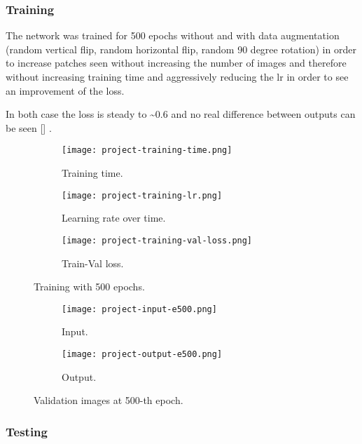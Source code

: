 \subsubsection{Training}

The network was trained for 500 epochs without and with data augmentation (random vertical flip, random horizontal flip, random 90 degree rotation) in order to increase patches seen without increasing the number of images and therefore without increasing training time and  aggressively reducing the lr in order to see an improvement of the loss.

In both case the loss is steady to \textasciitilde 0.6 and no real difference between outputs can be seen [] .

\begin{figure}[H]
    \begin{subfigure}{\textwidth}
        \centering
        \texttt{[image: project-training-time.png]}
        \caption{Training time.}
    \end{subfigure}
    \begin{subfigure}{\textwidth}
        \centering
        \texttt{[image: project-training-lr.png]}
        \caption{Learning rate over time.}
    \end{subfigure}
    \begin{subfigure}{\textwidth}
        \centering
        \texttt{[image: project-training-val-loss.png]}
        \caption{Train-Val loss.}
    \end{subfigure}
    \caption{Training with 500 epochs.}
\end{figure}

\begin{figure}[H]
    \begin{subfigure}{\textwidth}
        \centering
        \texttt{[image: project-input-e500.png]}
        \caption{Input.}
    \end{subfigure}
    \begin{subfigure}{\textwidth}
        \centering
        \texttt{[image: project-output-e500.png]}
        \caption{Output.}
    \end{subfigure}
    \caption{Validation images at 500-th epoch.}\label{project:training}
\end{figure}

\subsubsection{Testing}

